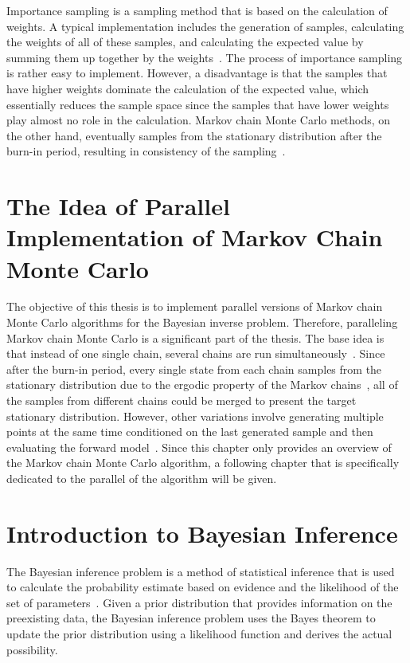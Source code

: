 Importance sampling is a sampling method that is based on the calculation of weights. A typical implementation includes the generation of samples, calculating the weights of all of these samples, and calculating the expected value by summing them up together by the weights~\cite{ImportanceSampling}. The process of importance sampling is rather easy to implement. However, a disadvantage is that the samples that have higher weights dominate the calculation of the expected value, which essentially reduces the sample space since the samples that have lower weights play almost no role in the calculation. Markov chain Monte Carlo methods, on the other hand, eventually samples from the stationary distribution after the burn-in period, resulting in consistency of the sampling~\cite{ComparisonSampling}.

\section{The Idea of Parallel Implementation of Markov Chain Monte Carlo}
The objective of this thesis is to implement parallel versions of Markov chain Monte Carlo algorithms for the Bayesian inverse problem. Therefore, paralleling Markov chain Monte Carlo is a significant part of the thesis. The base idea is that instead of one single chain, several chains are run simultaneously~\cite{base_parallel}. Since after the burn-in period, every single state from each chain samples from the stationary distribution due to the ergodic property of the Markov chains~\cite{ergodicity}, all of the samples from different chains could be merged to present the target stationary distribution. However, other variations involve generating multiple points at the same time conditioned on the last generated sample and then evaluating the forward model~\cite{gpmh_broshure}. Since this chapter only provides an overview of the Markov chain Monte Carlo algorithm, a following chapter that is specifically dedicated to the parallel of the algorithm will be given.

\section{Introduction to Bayesian Inference}
The Bayesian inference problem is a method of statistical inference that is used to calculate the probability estimate based on evidence and the likelihood of the set of parameters~\cite{bayesian_inference}. Given a prior distribution that provides information on the preexisting data, the Bayesian inference problem uses the Bayes theorem to update the prior distribution using a likelihood function and derives the actual possibility.

